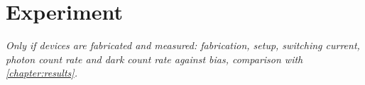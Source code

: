 \chapter{Experiment}
\label{chapter:experiment}

\emph{Only if devices are fabricated and measured: fabrication, setup, switching current, photon count rate and
dark count rate against bias, comparison with \cref{chapter:results}.}
